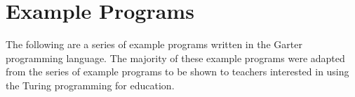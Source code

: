 \glsresetall %
\chapter{Example Programs}\label{ch:ExamplePrograms}

The following are a series of example programs written in the Garter programming
language. The majority of these example programs were adapted from the series of
example programs to be shown to teachers interested in using the Turing
programming for education.

